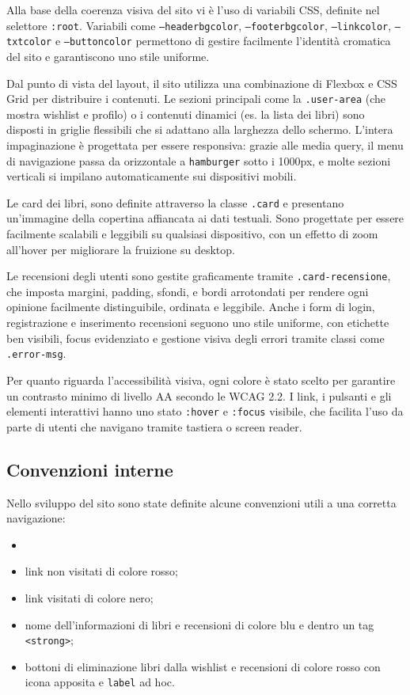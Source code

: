\documentclass{article}
\begin{document}
\medskip

\noindent
Alla base della coerenza visiva del sito vi è l’uso di variabili CSS, definite nel selettore \texttt{:root}. Variabili come \texttt{--headerbgcolor}, \texttt{--footerbgcolor}, \texttt{--linkcolor}, \texttt{--txtcolor} e \texttt{--buttoncolor} permettono di gestire facilmente l’identità cromatica del sito e garantiscono uno stile uniforme.

Dal punto di vista del layout, il sito utilizza una combinazione di Flexbox e CSS Grid per distribuire i contenuti. Le sezioni principali come la \texttt{.user-area} (che mostra wishlist e profilo) o i contenuti dinamici (es. la lista dei libri) sono disposti in griglie flessibili che si adattano alla larghezza dello schermo. L’intera impaginazione è progettata per essere responsiva: grazie alle media query, il menu di navigazione passa da orizzontale a \texttt{hamburger} sotto i 1000px, e molte sezioni verticali si impilano automaticamente sui dispositivi mobili.

Le card dei libri, sono definite attraverso la classe \texttt{.card} e presentano un’immagine della copertina affiancata ai dati testuali. Sono progettate per essere facilmente scalabili e leggibili su qualsiasi dispositivo, con un effetto di zoom all’hover per migliorare la fruizione su desktop.

Le recensioni degli utenti sono gestite graficamente tramite \texttt{.card-recensione}, che imposta margini, padding, sfondi, e bordi arrotondati per rendere ogni opinione facilmente distinguibile, ordinata e leggibile. Anche i form di login, registrazione e inserimento recensioni seguono uno stile uniforme, con etichette ben visibili, focus evidenziato e gestione visiva degli errori tramite classi come \texttt{.error-msg}.

Per quanto riguarda l’accessibilità visiva, ogni colore è stato scelto per garantire un contrasto minimo di livello AA secondo le WCAG 2.2. I link, i pulsanti e gli elementi interattivi hanno uno stato \texttt{:hover} e \texttt{:focus} visibile, che facilita l’uso da parte di utenti che navigano tramite tastiera o screen reader.

\medskip

\subsection{Convenzioni interne}
Nello sviluppo del sito sono state definite alcune convenzioni utili a una corretta navigazione:
\begin{itemize}
    \item 
    \item link non visitati di colore rosso;
    \item link visitati di colore nero;
    \item nome dell'informazioni di libri e recensioni di colore blu e dentro un tag \texttt{<strong>};
    \item bottoni di eliminazione libri dalla wishlist e recensioni di colore rosso con icona apposita e \texttt{label} ad hoc.
\end{itemize}
\end{document}
